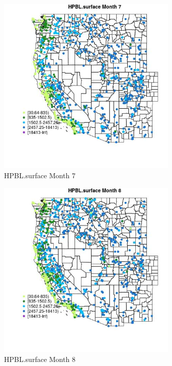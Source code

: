\begin{figure} 
\centering  
\includegraphics[width=0.77\textwidth]{Code_Outputs/Report_ML_input_PM25_Step4_part_f_de_duplicated_aves_prioritize_24hr_obswNAs_MapObsMo7HPBLsurface.jpg} 
\caption{\label{fig:Report_ML_input_PM25_Step4_part_f_de_duplicated_aves_prioritize_24hr_obswNAsMapObsMo7HPBLsurface}HPBL.surface Month 7} 
\end{figure} 
 

\begin{figure} 
\centering  
\includegraphics[width=0.77\textwidth]{Code_Outputs/Report_ML_input_PM25_Step4_part_f_de_duplicated_aves_prioritize_24hr_obswNAs_MapObsMo8HPBLsurface.jpg} 
\caption{\label{fig:Report_ML_input_PM25_Step4_part_f_de_duplicated_aves_prioritize_24hr_obswNAsMapObsMo8HPBLsurface}HPBL.surface Month 8} 
\end{figure} 
 

